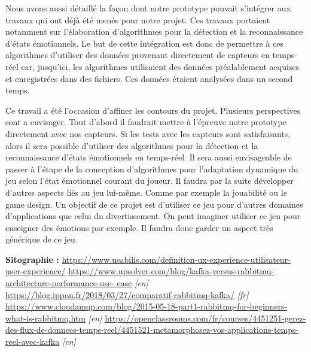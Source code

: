\documentclass[11pt]{article}
\begin{document}
	Nous avons aussi détaillé la façon dont notre prototype pouvait s'intégrer aux travaux qui ont déjà été menés pour notre projet.
	Ces travaux portaient notamment sur l'élaboration d'algorithmes pour la détection et la reconnaissance d'états émotionnels.
	Le but de cette intégration est donc de permettre à ces algorithmes d'utiliser des données provenant directement de capteurs en temps-réel car, jusqu'ici, les algorithmes utilisaient des données préalablement acquises et enregistrées dans des fichiers. 
	Ces données étaient analysées dans un second temps.\par
	Ce travail a été l'occasion d'affiner les contours du projet.
	Plusieurs perspectives sont a envisager.
	Tout d'abord il faudrait mettre à l'épreuve notre prototype directement avec nos capteurs.
	Si les tests avec les capteurs sont satisfaisants, alors il sera possible d'utiliser des algorithmes pour la détection et la reconnaissance d'états émotionnels en temps-réel.
	Il sera aussi envisageable de passer à l'étape de la conception d'algorithmes pour l'adaptation dynamique du jeu selon l'état émotionnel courant du joueur.
	Il faudra par la suite développer d'autres aspects liés au jeu lui-même.
	Comme par exemple la jouabilité ou le game design.
	Un objectif de ce projet est d'utiliser ce jeu pour d'autres domaines d'applications que celui du divertissement.
	On peut imaginer utiliser ce jeu pour enseigner des émotions par exemple.
	Il faudra donc garder un aspect très générique de ce jeu.


\newpage


\medskip

\hspace*{-1cm}
\Large{\textbf{Sitographie :}}\newline
\href{https://www.usabilis.com/definition-ux-experience-utilisateur-user-experience/}{https://www.usabilis.com/definition-ux-experience-utilisateur-user-experience/}\newline
\href{https://www.upsolver.com/blog/kafka-versus-rabbitmq-architecture-performance-use-
case}{https://www.upsolver.com/blog/kafka-versus-rabbitmq-architecture-performance-use-
case} \textit{[en]} \medskip\newline
\href{https://blog.ippon.fr/2018/03/27/comparatif-rabbitmq-kafka/}{https://blog.ippon.fr/2018/03/27/comparatif-rabbitmq-kafka/} \textit{[fr]}\medskip\newline
\href{https://www.cloudamqp.com/blog/2015-05-18-part1-rabbitmq-for-beginners-what-is-rabbitmq.htm}{https://www.cloudamqp.com/blog/2015-05-18-part1-rabbitmq-for-beginners-what-is-rabbitmq.htm} \textit{[en]}\medskip\newline
\href{https://openclassrooms.com/fr/courses/4451251-gerez-des-flux-de-donnees-temps-reel/4451521-metamorphosez-vos-applications-temps-reel-avec-kafka}{https://openclassrooms.com/fr/courses/4451251-gerez-des-flux-de-donnees-temps-reel/4451521-metamorphosez-vos-applications-temps-reel-avec-kafka} \textit{[en]}\newline
\end{document}
